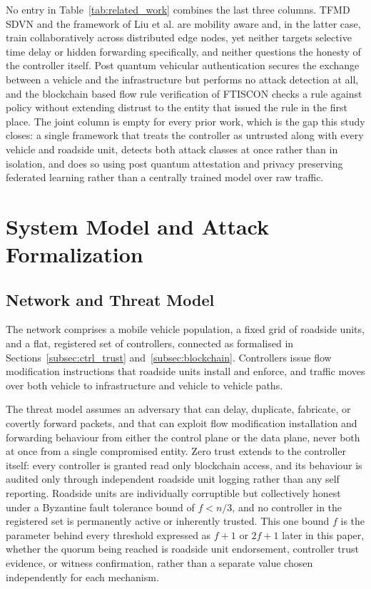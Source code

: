\documentclass[lettersize,journal]{IEEEtran}
\theoremstyle{plain}
\theoremstyle{remark}
\begin{document}
	No entry in Table~\ref{tab:related_work} combines the last three columns.
	TFMD SDVN and the framework of Liu et al. are mobility aware and, in the
	latter case, train collaboratively across distributed edge nodes, yet
	neither targets selective time delay or hidden forwarding specifically,
	and neither questions the honesty of the controller itself. Post quantum
	vehicular authentication secures the exchange between a vehicle and the
	infrastructure but performs no attack detection at all, and the
	blockchain based flow rule verification of FTISCON checks a rule against
	policy without extending distrust to the entity that issued the rule in
	the first place. The joint column is empty for every prior work, which is
	the gap this study closes: a single framework that treats the controller
	as untrusted along with every vehicle and roadside unit, detects both
	attack classes at once rather than in isolation, and does so using post
	quantum attestation and privacy preserving federated learning rather than
	a centrally trained model over raw traffic.
	
	
	\section{System Model and Attack Formalization}\label{system_model}
	
	\subsection{Network and Threat Model}\label{subsec:network_threat}
	
	The network comprises a mobile vehicle population, a fixed grid of
	roadside units, and a flat, registered set of controllers, connected as
	formalised in Sections~\ref{subsec:ctrl_trust} and~\ref{subsec:blockchain}.
	Controllers issue flow modification instructions that roadside units
	install and enforce, and traffic moves over both vehicle to
	infrastructure and vehicle to vehicle paths.
	
	The threat model assumes an adversary that can delay, duplicate,
	fabricate, or covertly forward packets, and that can exploit flow
	modification installation and forwarding behaviour from either the
	control plane or the data plane, never both at once from a single
	compromised entity. Zero trust extends to the controller itself: every
	controller is granted read only blockchain access, and its behaviour is
	audited only through independent roadside unit logging rather than any
	self reporting. Roadside units are individually corruptible but
	collectively honest under a Byzantine fault tolerance bound of
	$f<n/3$, and no controller in the registered set is permanently active
	or inherently trusted. This one bound $f$ is the parameter behind every
	threshold expressed as $f{+}1$ or $2f{+}1$ later in this paper, whether
	the quorum being reached is roadside unit endorsement, controller trust
	evidence, or witness confirmation, rather than a separate value chosen
	independently for each mechanism.
	
\end{document}
